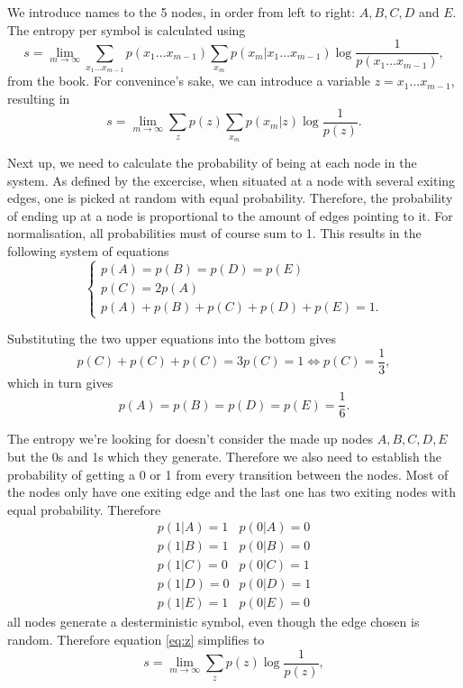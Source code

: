\documentclass[a4paper, 12pt]{article}
\begin{document}
We introduce names to the 5 nodes, in order from left to right: $A,B,C,D$ and $E$. The entropy per symbol is calculated using
\begin{equation}
    s = \lim_{m \rightarrow \infty} \sum_{x_1 \dots x_{m-1}} p(x_1 \dots x_{m-1})
    \sum_{x_m} p(x_m | x_1 \dots x_{m-1}) \log \frac{1}{p(x_1 \dots x_{m-1})},
\end{equation}
from the book. For convenince's sake, we can introduce a variable $z = x_1 \dots x_{m-1}$, resulting in
\begin{equation} \label{eq:z}
    s = \lim_{m \rightarrow \infty} \sum_{z} p(z)
    \sum_{x_m} p(x_m | z) \log \frac{1}{p(z)}.
\end{equation}

Next up, we need to calculate the probability of being at each node in the system. As defined by the excercise, when situated at a node with several exiting edges, one is picked at random with equal probability. Therefore, the probability of ending up at a node is proportional to the amount of edges pointing to it. For normalisation, all probabilities must of course sum to 1. This results in the following system of equations
\begin{equation}
    \begin{cases}
        p(A) = p(B) = p(D) = p(E) \\
        p(C) = 2p(A) \\
        p(A) + p(B) + p(C) + p(D) + p(E) = 1.
    \end{cases}
\end{equation}

Substituting the two upper equations into the bottom gives
\begin{equation}
    p(C) + p(C) + p(C) = 3 p(C) = 1 \iff p(C) = \frac{1}{3},
\end{equation}
which in turn gives
\begin{equation}
    p(A) = p(B) = p(D) = p(E) = \frac{1}{6}.
\end{equation}

The entropy we're looking for doesn't consider the made up nodes $A, B, C, D, E$ but the 0s and 1s which they generate. Therefore we also need to establish the probability of getting a 0 or 1 from every transition between the nodes. Most of the nodes only have one exiting edge and the last one has two exiting nodes with equal probability. Therefore
\begin{equation}
    \begin{matrix}
        p(1|A) = 1 & p(0|A) = 0 \\
        p(1|B) = 1 & p(0|B) = 0 \\
        p(1|C) = 0 & p(0|C) = 1 \\
        p(1|D) = 0 & p(0|D) = 1 \\
        p(1|E) = 1 & p(0|E) = 0
    \end{matrix}
\end{equation}
all nodes generate a desterministic symbol, even though the edge chosen is random. Therefore equation \eqref{eq:z} simplifies to
\begin{equation}
    s = \lim_{m \rightarrow \infty} \sum_z p(z) \log \frac{1}{p(z)},
\end{equation}
\end{document}
